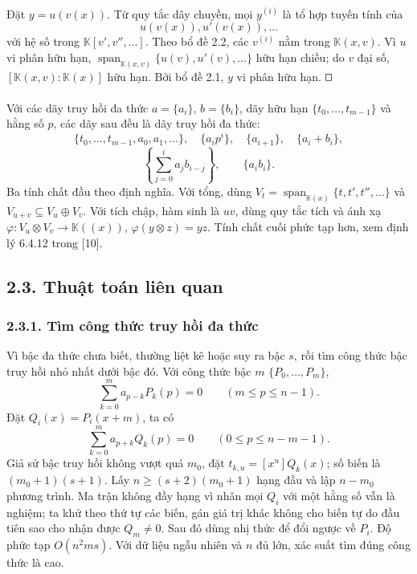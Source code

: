 \documentclass[11pt]{article}
\DeclareMathOperator{\spanop}{span}
\newcommand{\K}{\mathbb{K}}
\newcommand{\square}{\mathord{\vcenter{\hrule height .5pt
  \hbox{\vrule width .5pt height 5pt\kern5pt\vrule width .5pt}
  \hrule height .5pt}}}
\begin{document}
\paragraph{}
Đặt \(y=u(v(x))\). Từ quy tắc dây chuyền, mọi \(y^{(i)}\) là tổ hợp tuyến tính
của
\[
  u(v(x)),u'(v(x)),\ldots
\]
với hệ số trong \(\K[v',v'',\ldots]\). Theo bổ đề 2.2, các \(v^{(i)}\) nằm
trong \(\K(x,v)\). Vì \(u\) vi phân hữu hạn,
\(\spanop_{\K(x,v)}\{u(v),u'(v),\ldots\}\) hữu hạn chiều; do \(v\) đại số,
\([\K(x,v):\K(x)]\) hữu hạn. Bởi bổ đề 2.1, \(y\) vi phân hữu hạn. \(\square\)

\paragraph{}
Với các dãy truy hồi đa thức \(a=\{a_i\}\), \(b=\{b_i\}\), dãy hữu hạn
\(\{t_0,\ldots,t_{m-1}\}\) và hằng số \(p\), các dãy sau đều là dãy truy hồi
đa thức:
\[
\{t_0,\ldots,t_{m-1},a_0,a_1,\ldots\},\quad
\{a_i p^i\},\quad \{a_{i+1}\},\quad \{a_i+b_i\},
\]
\[
  \left\{\sum_{j=0}^{i}a_jb_{i-j}\right\},\qquad \{a_i b_i\}.
\]
Ba tính chất đầu theo định nghĩa. Với tổng, dùng \(V_t=\spanop_{\K(x)}
\{t,t',t'',\ldots\}\) và \(V_{u+v}\subseteq V_u\oplus V_v\). Với tích chập,
hàm sinh là \(uv\), dùng quy tắc tích và ánh xạ
\(\varphi:V_u\otimes V_v\to\K((x))\), \(\varphi(y\otimes z)=yz\). Tính chất
cuối phức tạp hơn, xem định lý 6.4.12 trong [10].

\subsection*{2.3. Thuật toán liên quan}

\subsubsection*{2.3.1. Tìm công thức truy hồi đa thức}

Vì bậc đa thức chưa biết, thường liệt kê hoặc suy ra bậc \(s\), rồi tìm công
thức bậc truy hồi nhỏ nhất dưới bậc đó. Với công thức bậc \(m\)
\(\{P_0,\ldots,P_m\}\),
\[
  \sum_{k=0}^{m}a_{p-k}P_k(p)=0\qquad(m\le p\le n-1).
\]
Đặt \(Q_i(x)=P_i(x+m)\), ta có
\[
  \sum_{k=0}^{m}a_{p+k}Q_k(p)=0\qquad(0\le p\le n-m-1).
\]
Giả sử bậc truy hồi không vượt quá \(m_0\), đặt \(t_{k,u}=[x^u]Q_k(x)\); số
biến là \((m_0+1)(s+1)\). Lấy \(n\ge(s+2)(m_0+1)\) hạng đầu và lập
\(n-m_0\) phương trình. Ma trận không đầy hạng vì nhân mọi \(Q_i\) với một
hằng số vẫn là nghiệm; ta khử theo thứ tự các biến, gán giá trị khác không cho
biến tự do đầu tiên sao cho nhận được \(Q_m\ne0\). Sau đó dùng nhị thức để đổi
ngược về \(P_i\). Độ phức tạp \(O(n^2ms)\). Với dữ liệu ngẫu nhiên và \(n\)
đủ lớn, xác suất tìm đúng công thức là cao.
\end{document}
